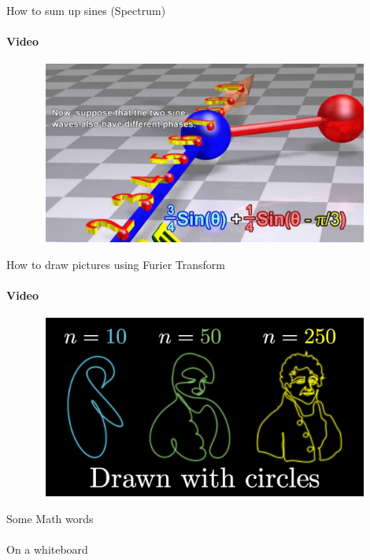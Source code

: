 \documentclass[aspectratio=169]{beamer}
\begin{document}
\begin{frame}[t]{How to sum up sines (Spectrum)}
    \framesubtitle{Video}
    \vspace{-0.6cm}
    \begin{figure}[H]
        \href{https://youtu.be/r18Gi8lSkfM}{
            \centering\includegraphics[height=6cm,width=1\textwidth,keepaspectratio]{Intro_to_fourier.jpg}}
        \label{fig:Intro_to_fourier.jpg}
    \end{figure}
\end{frame}

\begin{frame}[t]{How to draw pictures using Furier Transform}
    \framesubtitle{Video}
    \vspace{-0.6cm}
    \begin{figure}[H]
        \href{https://youtu.be/r6sGWTCMz2k}{
            \centering\includegraphics[height=6cm,width=1\textwidth,keepaspectratio]{drawn_with_circles.jpg}}
        \label{fig:drawn_with_circles.jpg}
    \end{figure}
\end{frame}

\begin{frame}[t]{Some Math words}
\framesubtitle{}
\Large
On a whiteboard
\end{frame}
\end{document}
